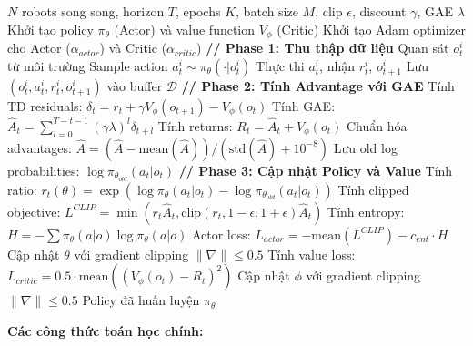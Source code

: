 \begin{algorithm}[H]
\caption{PPO với Đa Robot cho Tránh Va Chạm}
\label{alg:ppo}
\begin{algorithmic}[1]
\REQUIRE $N$ robots song song, horizon $T$, epochs $K$, batch size $M$, clip $\epsilon$, discount $\gamma$, GAE $\lambda$
\STATE Khởi tạo policy $\pi_\theta$ (Actor) và value function $V_\phi$ (Critic)
\STATE Khởi tạo Adam optimizer cho Actor ($\alpha_{actor}$) và Critic ($\alpha_{critic}$)
    \STATE \textbf{// Phase 1: Thu thập dữ liệu}
            \STATE Quan sát $o_t^i$ từ môi trường
            \STATE Sample action $a_t^i \sim \pi_\theta(\cdot|o_t^i)$
            \STATE Thực thi $a_t^i$, nhận $r_t^i$, $o_{t+1}^i$
            \STATE Lưu $(o_t^i, a_t^i, r_t^i, o_{t+1}^i)$ vào buffer $\mathcal{D}$
        \ENDFOR
    \ENDFOR
    \STATE \textbf{// Phase 2: Tính Advantage với GAE}
        \STATE Tính TD residuals: $\delta_t = r_t + \gamma V_\phi(o_{t+1}) - V_\phi(o_t)$
        \STATE Tính GAE: $\hat{A}_t = \sum_{l=0}^{T-t-1} (\gamma\lambda)^l \delta_{t+l}$
        \STATE Tính returns: $R_t = \hat{A}_t + V_\phi(o_t)$
    \ENDFOR
    \STATE Chuẩn hóa advantages: $\hat{A} = (\hat{A} - \text{mean}(\hat{A})) / (\text{std}(\hat{A}) + 10^{-8})$
    \STATE Lưu old log probabilities: $\log \pi_{\theta_{old}}(a_t|o_t)$
    \STATE \textbf{// Phase 3: Cập nhật Policy và Value}
            \STATE Tính ratio: $r_t(\theta) = \exp(\log \pi_\theta(a_t|o_t) - \log \pi_{\theta_{old}}(a_t|o_t))$
            \STATE Tính clipped objective: $L^{CLIP} = \min(r_t \hat{A}_t, \text{clip}(r_t, 1-\epsilon, 1+\epsilon) \hat{A}_t)$
            \STATE Tính entropy: $H = -\sum \pi_\theta(a|o) \log \pi_\theta(a|o)$
            \STATE Actor loss: $L_{actor} = -\text{mean}(L^{CLIP}) - c_{ent} \cdot H$
            \STATE Cập nhật $\theta$ với gradient clipping $\|\nabla\| \leq 0.5$
            \STATE Tính value loss: $L_{critic} = 0.5 \cdot \text{mean}((V_\phi(o_t) - R_t)^2)$
            \STATE Cập nhật $\phi$ với gradient clipping $\|\nabla\| \leq 0.5$
        \ENDFOR
    \ENDFOR
\ENDFOR
\RETURN Policy đã huấn luyện $\pi_\theta$
\end{algorithmic}
\end{algorithm}

\textbf{Các công thức toán học chính:}

